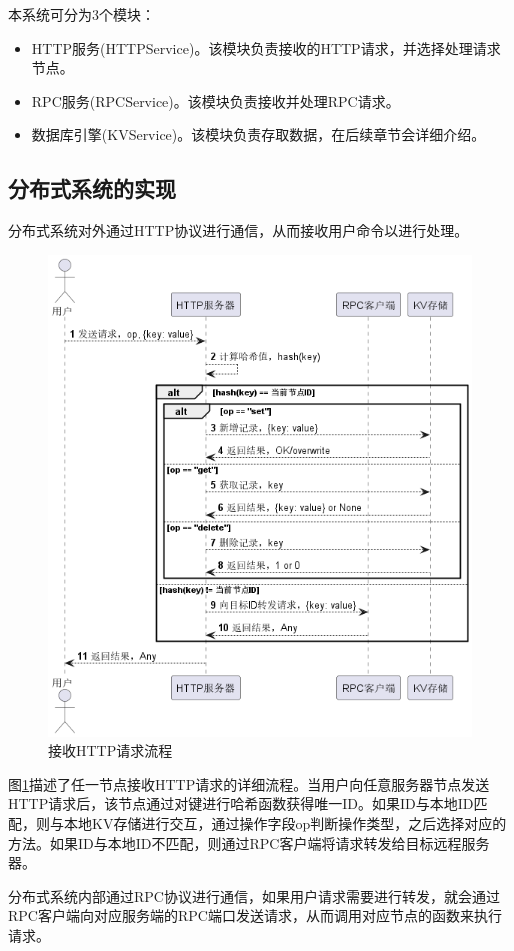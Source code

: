 本系统可分为3个模块：
\begin{itemize}
    \item HTTP服务(HTTPService)。该模块负责接收的HTTP请求，并选择处理请求节点。
    \item RPC服务(RPCService)。该模块负责接收并处理RPC请求。
    \item 数据库引擎(KVService)。该模块负责存取数据，在后续章节会详细介绍。
\end{itemize}

\subsection{分布式系统的实现}

分布式系统对外通过HTTP协议进行通信，从而接收用户命令以进行处理。

\begin{figure}[H]
    \centering
    \includegraphics[width=0.8\linewidth]{examples/接收http流程.png}
    \caption{接收HTTP请求流程}
    \label{fig:recvhttp}
\end{figure}

图\ref{fig:recvhttp}描述了任一节点接收HTTP请求的详细流程。当用户向任意服务器节点发送HTTP请求后，该节点通过对键进行哈希函数获得唯一ID。如果ID与本地ID匹配，则与本地KV存储进行交互，通过操作字段op判断操作类型，之后选择对应的方法。如果ID与本地ID不匹配，则通过RPC客户端将请求转发给目标远程服务器。

分布式系统内部通过RPC协议进行通信，如果用户请求需要进行转发，就会通过RPC客户端向对应服务端的RPC端口发送请求，从而调用对应节点的函数来执行请求。

